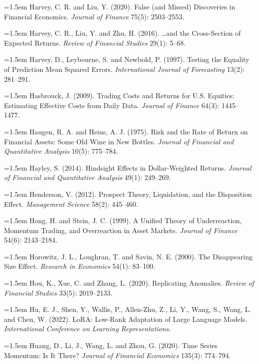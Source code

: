 \hangindent=1.5em Harvey, C. R. and Liu, Y. (2020). False (and Missed) Discoveries in Financial Economics. \emph{Journal of Finance} 75(5): 2503--2553.

\hangindent=1.5em Harvey, C. R., Liu, Y. and Zhu, H. (2016). \ldots and the Cross-Section of Expected Returns. \emph{Review of Financial Studies} 29(1): 5--68.

\hangindent=1.5em Harvey, D., Leybourne, S. and Newbold, P. (1997). Testing the Equality of Prediction Mean Squared Errors. \emph{International Journal of Forecasting} 13(2): 281--291.

\hangindent=1.5em Hasbrouck, J. (2009). Trading Costs and Returns for U.S. Equities: Estimating Effective Costs from Daily Data. \emph{Journal of Finance} 64(3): 1445--1477.

\hangindent=1.5em Haugen, R. A. and Heins, A. J. (1975). Risk and the Rate of Return on Financial Assets: Some Old Wine in New Bottles. \emph{Journal of Financial and Quantitative Analysis} 10(5): 775--784.

\hangindent=1.5em Hayley, S. (2014). Hindsight Effects in Dollar-Weighted Returns. \emph{Journal of Financial and Quantitative Analysis} 49(1): 249--269.

\hangindent=1.5em Henderson, V. (2012). Prospect Theory, Liquidation, and the Disposition Effect. \emph{Management Science} 58(2): 445--460.

\hangindent=1.5em Hong, H. and Stein, J. C. (1999). A Unified Theory of Underreaction, Momentum Trading, and Overreaction in Asset Markets. \emph{Journal of Finance} 54(6): 2143--2184.

\hangindent=1.5em Horowitz, J. L., Loughran, T. and Savin, N. E. (2000). The Disappearing Size Effect. \emph{Research in Economics} 54(1): 83--100.

\hangindent=1.5em Hou, K., Xue, C. and Zhang, L. (2020). Replicating Anomalies. \emph{Review of Financial Studies} 33(5): 2019--2133.

\hangindent=1.5em Hu, E. J., Shen, Y., Wallis, P., Allen-Zhu, Z., Li, Y., Wang, S., Wang, L. and Chen, W. (2022). LoRA: Low-Rank Adaptation of Large Language Models. \emph{International Conference on Learning Representations}.

\hangindent=1.5em Huang, D., Li, J., Wang, L. and Zhou, G. (2020). Time Series Momentum: Is It There? \emph{Journal of Financial Economics} 135(3): 774--794.

